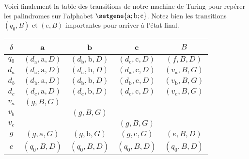 Voici finalement la table des transitions de notre machine de Turing pour repérer les palindromes sur l'alphabet $\setgene{\text{a} ; \text{b} ; \text{c}}$. Notez bien les transitions $(q_0 , B)$ et $(e , B)$ importantes pour arriver à l'état final.
\begin{center}
	\begin{tabular}{|c||c|c|c|c|}
		\hline
		$\delta$ 
			& a 
			& b 
			& c 
			& $B$ \\
		\hline
		\hline
		$q_0$
			& $(d_\text{a} , \text{a} , D)$
			& $(d_\text{b} , \text{b} , D)$
			& $(d_\text{c} , \text{c} , D)$
			& $(f          , B        , D)$ \\
		\hline
		\hline
		$d_a$
			& $(d_\text{a} , \text{a} , D)$
			& $(d_\text{a} , \text{b} , D)$
			& $(d_\text{a} , \text{c} , D)$
			& $(v_\text{a} , B        , G)$ \\
		\hline
		$d_b$
			& $(d_\text{b} , \text{a} , D)$
			& $(d_\text{b} , \text{b} , D)$
			& $(d_\text{b} , \text{c} , D)$
			& $(v_\text{b} , B        , G)$ \\
		\hline
		$d_c$
			& $(d_\text{c} , \text{a} , D)$
			& $(d_\text{c} , \text{b} , D)$
			& $(d_\text{c} , \text{c} , D)$
			& $(v_\text{c} , B        , G)$ \\
		\hline
		\hline
		$v_a$
			& $(g , B , G)$
			& 
			& 
			&  \\
		\hline
		$v_b$
			& 
			& $(g , B , G)$
			& 
			&  \\
		\hline
		$v_c$
			& 
			& 
			& $(g , B , G)$
			&  \\
		\hline
		\hline
		$g$
			& $(g , \text{a} , G)$
			& $(g , \text{b} , G)$
			& $(g , \text{c} , G)$
			& $(e , B        , D)$ \\
		\hline
		$e$
			& $(q_0 , B , D)$
			& $(q_0 , B , D)$
			& $(q_0 , B , D)$
			& $(q_0 , B , D)$ \\
		\hline
	\end{tabular}
\end{center}


